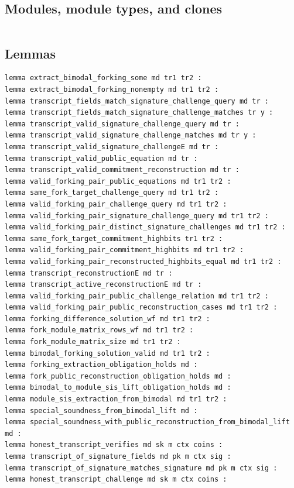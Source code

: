 \subsection*{Modules, module types, and clones}
\begin{lstlisting}[language=EasyCrypt,basicstyle=\ttfamily\tiny]
\end{lstlisting}

\subsection*{Lemmas}
\begin{lstlisting}[language=EasyCrypt,basicstyle=\ttfamily\tiny]
lemma extract_bimodal_forking_some md tr1 tr2 :
lemma extract_bimodal_forking_nonempty md tr1 tr2 :
lemma transcript_fields_match_signature_challenge_query md tr :
lemma transcript_fields_match_signature_challenge_matches tr y :
lemma transcript_valid_signature_challenge_query md tr :
lemma transcript_valid_signature_challenge_matches md tr y :
lemma transcript_valid_signature_challengeE md tr :
lemma transcript_valid_public_equation md tr :
lemma transcript_valid_commitment_reconstruction md tr :
lemma valid_forking_pair_public_equations md tr1 tr2 :
lemma same_fork_target_challenge_query md tr1 tr2 :
lemma valid_forking_pair_challenge_query md tr1 tr2 :
lemma valid_forking_pair_signature_challenge_query md tr1 tr2 :
lemma valid_forking_pair_distinct_signature_challenges md tr1 tr2 :
lemma same_fork_target_commitment_highbits tr1 tr2 :
lemma valid_forking_pair_commitment_highbits md tr1 tr2 :
lemma valid_forking_pair_reconstructed_highbits_equal md tr1 tr2 :
lemma transcript_reconstructionE md tr :
lemma transcript_active_reconstructionE md tr :
lemma valid_forking_pair_public_challenge_relation md tr1 tr2 :
lemma valid_forking_pair_public_reconstruction_cases md tr1 tr2 :
lemma forking_difference_solution_wf md tr1 tr2 :
lemma fork_module_matrix_rows_wf md tr1 tr2 :
lemma fork_module_matrix_size md tr1 tr2 :
lemma bimodal_forking_solution_valid md tr1 tr2 :
lemma forking_extraction_obligation_holds md :
lemma fork_public_reconstruction_obligation_holds md :
lemma bimodal_to_module_sis_lift_obligation_holds md :
lemma module_sis_extraction_from_bimodal md tr1 tr2 :
lemma special_soundness_from_bimodal_lift md :
lemma special_soundness_with_public_reconstruction_from_bimodal_lift md :
lemma honest_transcript_verifies md sk m ctx coins :
lemma transcript_of_signature_fields md pk m ctx sig :
lemma transcript_of_signature_matches_signature md pk m ctx sig :
lemma honest_transcript_challenge md sk m ctx coins :
\end{lstlisting}

